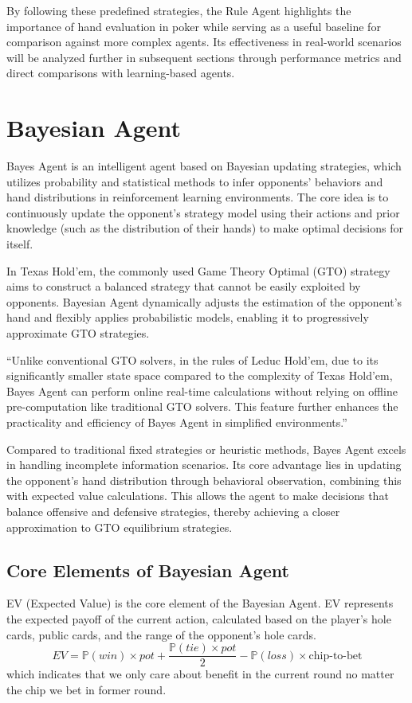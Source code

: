 \documentclass{article}
\begin{document}
By following these predefined strategies, the Rule Agent highlights the importance of hand evaluation in poker while serving as a useful baseline for comparison against more complex agents. Its effectiveness in real-world scenarios will be analyzed further in subsequent sections through performance metrics and direct comparisons with learning-based agents.


\section{Bayesian Agent}
Bayes Agent is an intelligent agent based on Bayesian updating strategies, which utilizes probability and statistical methods to infer opponents’ behaviors and hand distributions in reinforcement learning environments. The core idea is to continuously update the opponent’s strategy model using their actions and prior knowledge (such as the distribution of their hands) to make optimal decisions for itself.

In Texas Hold’em, the commonly used Game Theory Optimal (GTO) strategy aims to construct a balanced strategy that cannot be easily exploited by opponents. Bayesian Agent dynamically adjusts the estimation of the opponent’s hand and flexibly applies probabilistic models, enabling it to progressively approximate GTO strategies.

“Unlike conventional GTO solvers, in the rules of Leduc Hold’em, due to its significantly smaller state space compared to the complexity of Texas Hold’em, Bayes Agent can perform online real-time calculations without relying on offline pre-computation like traditional GTO solvers. This feature further enhances the practicality and efficiency of Bayes Agent in simplified environments.”

Compared to traditional fixed strategies or heuristic methods, Bayes Agent excels in handling incomplete information scenarios. Its core advantage lies in updating the opponent’s hand distribution through behavioral observation, combining this with expected value calculations. This allows the agent to make decisions that balance offensive and defensive strategies, thereby achieving a closer approximation to GTO equilibrium strategies.
\subsection{Core Elements of Bayesian Agent}
EV (Expected Value) is the core element of the Bayesian Agent. EV represents the expected payoff of the current action, calculated based on the player’s hole cards, public cards, and the range of the opponent’s hole cards.
\[EV = \mathbb P(win) \times pot + \frac{\mathbb P(tie) \times pot}{2} - \mathbb P(loss) \times \text{chip-to-bet}\]
which indicates that we only care about benefit in the current round no matter the chip we bet in former round.
\end{document}
